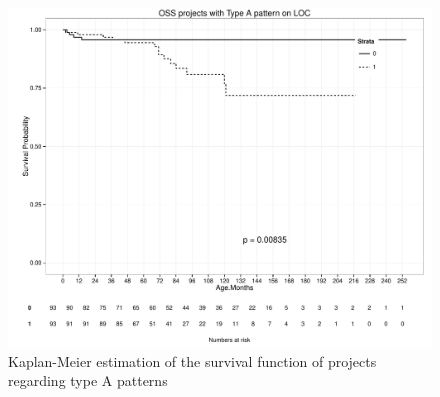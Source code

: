 \begin{figure}[H]
\caption{Kaplan-Meier estimation of the survival function of projects regarding
type A patterns}\label{figure:kp_survival}
\centering
	\includegraphics[width=386pt]{images/survival_LOC.pdf}
\end{figure}